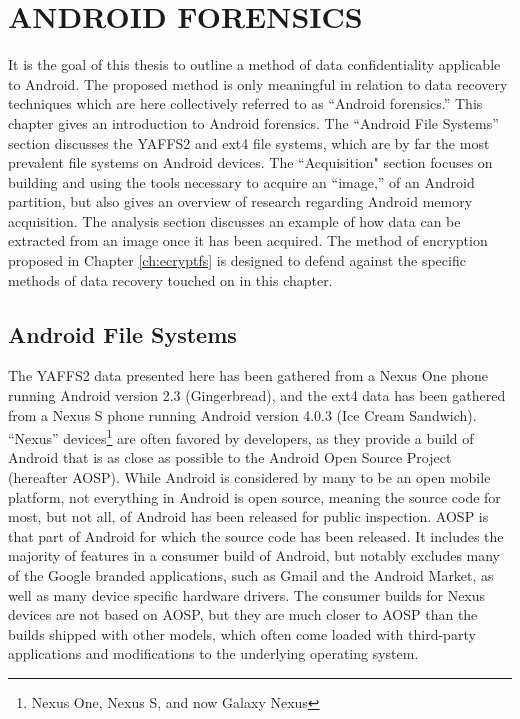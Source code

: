 \chapter{ANDROID FORENSICS}
\label{ch:forensics}
It is the goal of this thesis to outline a method of data confidentiality applicable to Android. The proposed method is only
meaningful in relation to data recovery techniques which are here collectively referred to as ``Android forensics.'' This chapter
gives an introduction to Android forensics.  The ``Android File Systems'' section discusses the YAFFS2 and ext4 file systems, which
are by far the most prevalent file systems on Android devices.  The ``Acquisition" section focuses on building and using the tools
necessary to acquire an ``image,'' of an Android partition, but also gives an overview of research regarding Android memory
acquisition. The analysis section discusses an example of how data can be extracted from an image once it has been acquired.  The
method of encryption proposed in Chapter \ref{ch:ecryptfs} is designed to defend against the specific methods of data
recovery touched on in this chapter.

\section{Android File Systems}

The YAFFS2 data presented here has been gathered from a Nexus One phone running Android version 2.3 (Gingerbread), and the
ext4 data has been gathered from a Nexus S phone running Android version 4.0.3 (Ice Cream Sandwich).  ``Nexus''
devices\footnote{Nexus One, Nexus S, and now Galaxy Nexus} are often favored by developers, as they provide a build of Android that
is as close as possible to the Android Open Source Project (hereafter AOSP). While Android is considered by many to be an open
mobile platform, not everything in Android is open source, meaning the source code for most, but not all, of Android has been
released for public inspection.  AOSP is that part of Android for which the source code has been released.  It includes the majority
of features in a consumer build of Android, but notably excludes many of the Google branded applications, such as Gmail and the
Android Market, as well as many device specific hardware drivers. The consumer builds for Nexus devices are not based on AOSP, but
they are much closer to AOSP than the builds shipped with other models, which often come loaded with third-party applications and
modifications to the underlying operating system.

